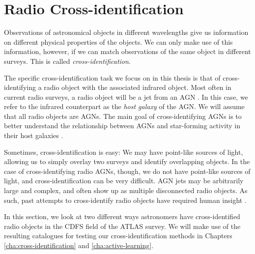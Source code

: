     \section{Radio Cross-identification}
    \label{sec:radio-cross-identification}


        Observations of astronomical objects in different wavelengths give us
        information on different physical properties of the objects. We can only
        make use of this information, however, if we can match observations of
        the same object in different surveys. This is called
        \emph{cross-identification}.

        The specific cross-identification task we focus on in this thesis is
        that of cross-identifying a radio object with the associated infrared
        object. Most often in current radio surveys, a radio object will be a
        jet from an AGN \citep{norris11}. In this case, we refer to the infrared
        counterpart as the \emph{host galaxy} of the AGN. We will assume that
        all radio objects are AGNs. The main goal of cross-identifying AGNs is
        to better understand the relationship between AGNs and star-forming
        activity in their host galaxies \citep{norris06}.

        Sometimes, cross-identification is easy: We may have point-like sources
        of light, allowing us to simply overlay two surveys and identify
        overlapping objects. In the case of cross-identifying radio AGNs,
        though, we do not have point-like sources of light, and
        cross-identification can be very difficult. AGN jets may be arbitrarily
        large and complex, and often show up as multiple disconnected radio
        objects. As such, past attempts to cross-identify radio objects have
        required human insight
        \citep{norris06,fan15}.

        In this section, we look at two different ways astronomers have
        cross-identified radio objects in the CDFS field of the ATLAS survey. We
        will make use of the resulting catalogues for testing our
        cross-identification methods in Chapters \ref{cha:cross-identification}
        and \ref{cha:active-learning}.

